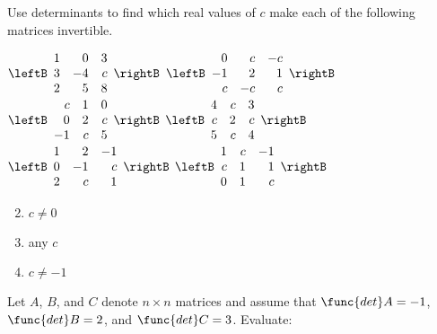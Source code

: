 \begin{multicols}{2}
\begin{ex}
Use determinants to find which real values of $c$ make each of the following matrices invertible.

\begin{exenumerate}
\exitem  $\leftB \begin{array}{rrr}
1 & 0 & 3 \\
3 & -4 & c \\
2 & 5 & 8
\end{array}\rightB$
\exitem  $\leftB \begin{array}{rrr}
0 & c & -c \\
-1 & 2 & 1 \\
c & -c & c
\end{array}\rightB$
\exitem  $\leftB \begin{array}{rrr}
c & 1 & 0 \\
0 & 2 & c \\
-1 & c & 5
\end{array}\rightB$
\exitem  $\leftB \begin{array}{rrr}
4 & c & 3 \\
c & 2 & c \\
5 & c & 4
\end{array}\rightB$
\exitem  $\leftB \begin{array}{rrr}
1 & 2 & -1 \\
0 & -1 & c \\
2 & c & 1
\end{array}\rightB$
\exitem  $\leftB \begin{array}{rrr}
1 & c & -1 \\
c & 1 & 1 \\
0 & 1 & c
\end{array}\rightB$
\end{exenumerate}
\begin{sol}
\begin{enumerate}[label={\alph*.}]
\setcounter{enumi}{1}
\item  $c \neq 0$

\setcounter{enumi}{3}
\item  any $c$

\setcounter{enumi}{5}
\item  $c \neq -1$

\end{enumerate}
\end{sol}
\end{ex}

\begin{ex}
Let $A$, $B$, and $C$ denote $n \times n$ matrices and assume that $\func{det } A = -1$, $\func{det } B = 2$, and $\func{det } C = 3$. Evaluate:


\end{ex}
\end{multicols}
